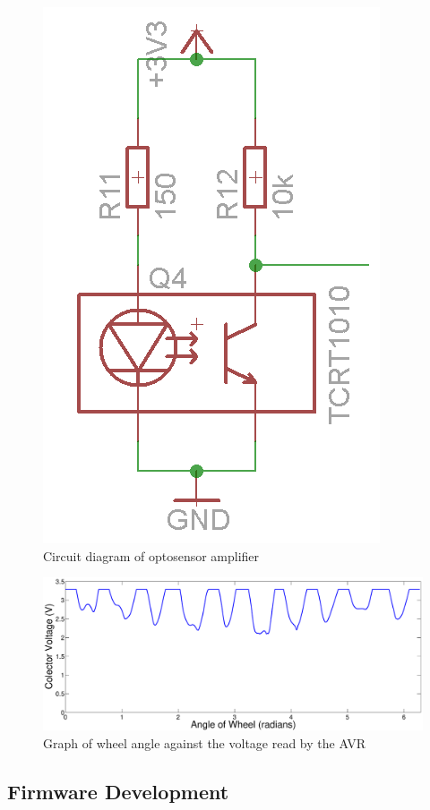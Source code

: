 \begin{figure}
\centering
\includegraphics[scale=0.5]{Figures/TCRT_Circuit.png}
\caption{Circuit diagram of optosensor amplifier}
\label{Circuit:TCRT1010}
\end{figure}

\begin{figure}
\includegraphics[width = \textwidth]{Figures/WheelVoltageGraph.eps}
\caption{Graph of wheel angle against the voltage read by the AVR}
\label{Graph:WheelVoltage}
\end{figure}
 

\subsection{Firmware Development}

